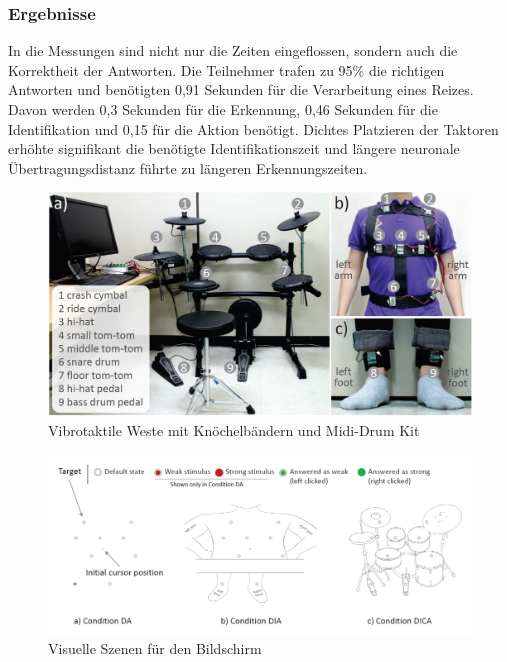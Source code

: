 \documentclass[ngerman,runningheads,a4paper]{llncs}
\begin{document}
\subsubsection{Ergebnisse}
In die Messungen sind nicht nur die Zeiten eingeflossen, sondern auch die Korrektheit der Antworten. Die Teilnehmer trafen zu 95\% die richtigen Antworten und benötigten 0,91 Sekunden für die Verarbeitung eines Reizes. Davon werden 0,3 Sekunden für die Erkennung, 0,46 Sekunden für die Identifikation und 0,15 für die Aktion benötigt. Dichtes Platzieren der Taktoren erhöhte signifikant die benötigte Identifikationszeit und längere neuronale Übertragungsdistanz führte zu längeren Erkennungszeiten.



\begin{figure}[H]
  \centering
  \includegraphics[width = \textwidth]{pictures/vibrotactilevest2}
  \caption{Vibrotaktile Weste mit Knöchelbändern und Midi-Drum Kit\cite{6775447}}
  \label{vest}
\end{figure}

\begin{figure}[H]
  \centering
  \includegraphics[width = \textwidth]{pictures/vestpc}
  \caption{Visuelle Szenen für den Bildschirm\cite{6775447}}
  \label{vest2}
\end{figure}
\end{document}
